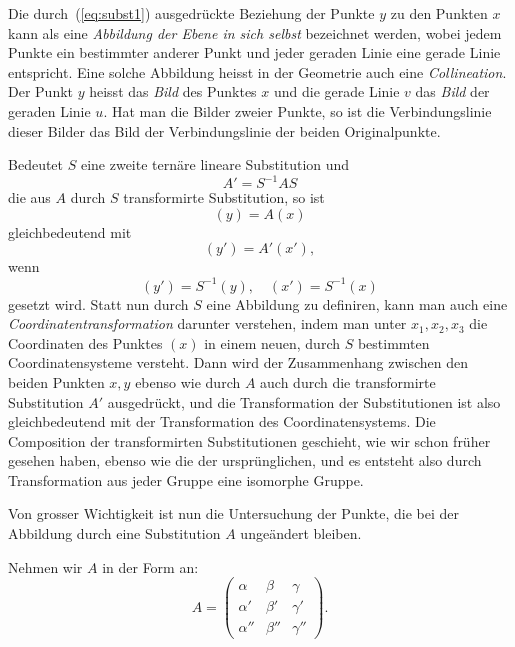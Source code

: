 \documentclass[12pt,a4paper]{article}
\begin{document}
Die durch~(\ref{eq:subst1}) ausgedr\"uckte Beziehung der Punkte $y$ zu den Punkten $x$ kann als eine \textit{Abbildung der Ebene in sich selbst} bezeichnet werden, wobei jedem Punkte ein bestimmter anderer Punkt und jeder geraden Linie eine gerade Linie entspricht. Eine solche Abbildung heisst in der Geometrie auch eine \textit{Collineation}. Der Punkt $y$ heisst das \textit{Bild} des Punktes $x$ und die gerade Linie $v$ das \textit{Bild} der geraden Linie $u$. Hat man die Bilder zweier Punkte, so ist die Verbindungslinie dieser Bilder das Bild der Verbindungslinie der beiden Originalpunkte.

Bedeutet $S$ eine zweite tern\"are lineare Substitution und
\[A' = S^{-1}AS\]
die aus $A$ durch $S$ transformirte Substitution, so ist
\[(y) = A(x)\]
gleichbedeutend mit
\begin{equation}
\label{eq:transform} (y') = A'(x'),
\end{equation}
wenn
\[(y') = S^{-1}(y), \quad (x') = S^{-1}(x)\]
gesetzt wird. Statt nun durch $S$ eine Abbildung zu definiren, kann man auch eine \textit{Coordinatentransformation} darunter verstehen, indem man unter $x_1, x_2, x_3$ die Coordinaten des Punktes $(x)$ in einem neuen, durch $S$ bestimmten Coordinatensysteme versteht. Dann wird der Zusammenhang zwischen den beiden Punkten $x, y$ ebenso wie durch $A$ auch durch die transformirte Substitution $A'$ ausgedr\"uckt, und die Transformation der Substitutionen ist also gleichbedeutend mit der Transformation des Coordinatensystems. Die Composition der transformirten Substitutionen geschieht, wie wir schon fr\"uher gesehen haben, ebenso wie die der urspr\"unglichen, und es entsteht also durch Transformation aus jeder Gruppe eine isomorphe Gruppe.

Von grosser Wichtigkeit ist nun die Untersuchung der Punkte, die bei der Abbildung durch eine Substitution $A$ unge\"andert bleiben.

Nehmen wir $A$ in der Form an:
\[ A = \begin{pmatrix} \alpha & \beta & \gamma \\ \alpha' & \beta' & \gamma' \\ \alpha'' & \beta'' & \gamma'' \end{pmatrix}. \]
\end{document}

